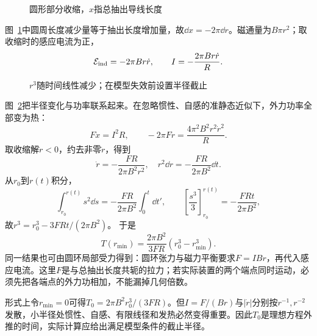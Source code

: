 \begin{figure}[H]\centering
{}
\caption{圆形部分收缩，$x$指总抽出导线长度}\label{fig:i3-e16-q}
\end{figure}
\begin{solution}
图~\ref{fig:i3-e16-q}中圆周长度减少量等于抽出长度增加量，故$\dd x=-2\pi\dd r$。磁通量为$B\pi r^2$；取收缩时的感应电流为正，
\[
\mathcal E_{\rm ind}=-2\pi Br\dot r,\qquad
I=-\frac{2\pi Br\dot r}{R}.
\]

\begin{figure}[H]\centering
{}
\caption{$r^3$随时间线性减少；在模型失效前设置半径截止}\label{fig:i3-e16-s}
\end{figure}

图~\ref{fig:i3-e16-s}把半径变化与功率联系起来。在忽略惯性、自感的准静态近似下，外力功率全部变为热：
\[
F\dot x=I^2R,\qquad
-2\pi F\dot r=\frac{4\pi^2B^2r^2\dot r^2}{R}.
\]
取收缩解$\dot r<0$，约去非零$\dot r$，得到
\[
\dot r=-\frac{FR}{2\pi B^2r^2},\quad
r^2\dd r=-\frac{FR}{2\pi B^2}\dd t.
\]
从$r_0$到$r(t)$积分，
\[\int_{r_0}^{r(t)}s^2\dd s=-\frac{FR}{2\pi B^2}\int_0^t\dd t',\qquad
\left[\frac{s^3}3\right]_{r_0}^{r(t)}=-\frac{FRt}{2\pi B^2},\]
故$r^3=r_0^3-3FRt/(2\pi B^2)$。
于是
\[
\boxed{T(r_{\min})=\frac{2\pi B^2}{3FR}(r_0^3-r_{\min}^3)}.
\]
同一结果也可由圆环局部受力得到：圆环张力与磁力平衡要求$F=IBr$，再代入感应电流。这里$F$是与总抽出长度共轭的拉力；若实际装置的两个端点同时运动，必须先把各端点的外力功相加，不能漏掉几何倍数。

形式上令$r_{\min}=0$可得$T_0=2\pi B^2r_0^3/(3FR)$。但$I=F/(Br)$与$|\dot r|$分别按$r^{-1},r^{-2}$发散，小半径处惯性、自感、有限线径和发热必然变得重要。因此$T_0$是理想方程外推的时间，实际计算应给出满足模型条件的截止半径。
\end{solution}


